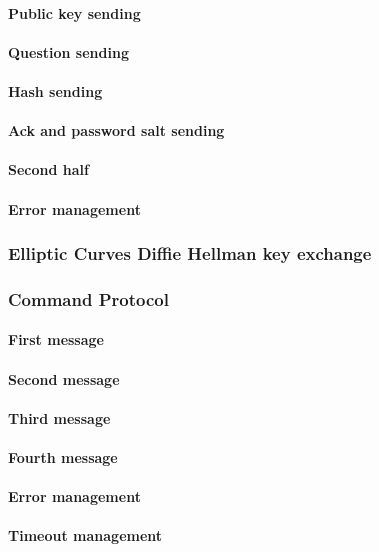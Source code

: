 \documentclass[a4paper,12pt]{article}
\begin{document}
			\paragraph{Public key sending}
			\paragraph{Question sending}
			\paragraph{Hash sending}
			\paragraph{Ack and password salt sending}
			\paragraph{Second half}
			\paragraph{Error management}
		\subsubsection{Elliptic Curves Diffie Hellman key exchange}
		\subsubsection{Command Protocol}
			\paragraph{First message}
			\paragraph{Second message}
			\paragraph{Third message}
			\paragraph{Fourth message}
			\paragraph{Error management}
			\paragraph{Timeout management}
\end{document}
